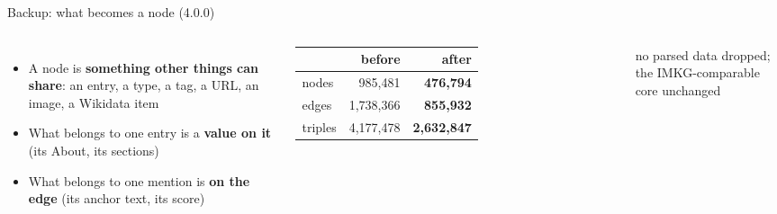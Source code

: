 
\begin{frame}{Backup: what becomes a node (4.0.0)}
  \begin{columns}[t]
      \begin{itemize}\setlength{\itemsep}{3mm}\large
        \item A node is \textbf{something other things can share}: an entry, a type, a tag, a URL,
          an image, a Wikidata item
        \item What belongs to one entry is a \textbf{value on it} (its About, its sections)
        \item What belongs to one mention is \textbf{on the edge} (its anchor text, its score)
      \end{itemize}
      {\Large\begin{tabular}[t]{@{}lrr@{}}
        & before & after\\\midrule
        nodes   & 985,481   & \textbf{476,794}\\
        edges   & 1,738,366 & \textbf{855,932}\\
        triples & 4,177,478 & \textbf{2,632,847}\\
      \end{tabular}}\par\vskip3mm
      {\large\color{gmInk2}no parsed data dropped; the IMKG-comparable core unchanged}
  \end{columns}
\end{frame}

